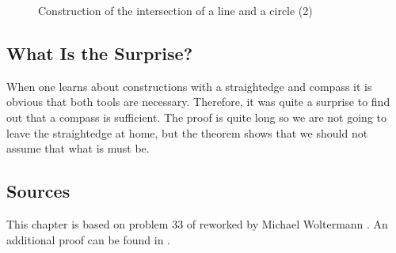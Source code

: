 \begin{figure}[t]
\begin{center}
\end{center}
\caption{Construction of  the intersection of a line and a circle (2)}\label{f.compass-circle5}
\end{figure}

\subsection*{What Is the Surprise?}

When one learns about constructions with a straightedge and compass it is obvious that both tools are necessary. Therefore,  it was quite a surprise to find out that a compass is sufficient. The proof is quite long so we are not going to leave the straightedge at home, but the theorem shows that we should not assume that what is must be.

\subsection*{Sources}

This chapter is based on problem $33$ of \cite{dorrie1} reworked by Michael Woltermann \cite{dorrie2}. An additional proof can be found in \cite{mm}.
